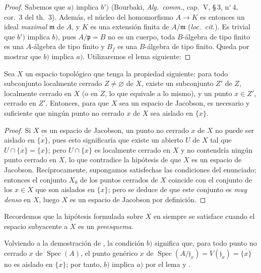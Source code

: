 \begin{proof}
Sabemos que $a)$ implica $b')$ (Bourbaki, \emph{Alg.\ comm.}, cap.~V, \S\,3, n$^\circ$\,4, cor.~3 del th.~3).
Además, el núcleo del homomorfismo $A\to K$ es entonces un ideal \emph{maximal} $\mathfrak{m}$ de $A$, y $K$ es una extensión finita de $A/\mathfrak{m}$ (\emph{loc.\ cit.}).
Es trivial que $b')$ implica $b)$, pues $A/\mathfrak{p}=B$ no es un cuerpo, toda $B$-álgebra de tipo finito es una $A$-álgebra de tipo finito y $B_f$ es una $B$-álgebra de tipo finito.
Queda por mostrar que $b)$ implica $a)$.
Utilizaremos el lema siguiente:
\end{proof}

\begin{lemma}[10.4.5.1]
\label{IV.10.4.5.1}
Sea $X$ un espacio topológico que tenga la propiedad siguiente: para todo subconjunto localmente cerrado $Z\neq\varnothing$ de $X$, existe un subconjunto $Z'$ de $Z$, localmente cerrado en $X$ (o en $Z$, lo que equivale a lo mismo), y un punto $x\in Z'$, cerrado en $Z'$.
Entonces, para que $X$ sea un espacio de Jacobson, es necesario y suficiente que ningún punto no cerrado $x$ de $X$ sea aislado en $\overline{\{x\}}$.
\end{lemma}

\begin{proof}
Si $X$ es un espacio de Jacobson, un punto no cerrado $x$ de $X$ no puede ser aislado en $\overline{\{x\}}$, pues esto significaría que existe un abierto $U$ de $X$ tal que $U\cap\overline{\{x\}}=\{x\}$; pero $U\cap\overline{\{x\}}$ es localmente cerrado en $X$ y no contendría ningún punto cerrado en $X$, lo que contradice la hipótesis de que $X$ es un espacio de Jacobson.
Recíprocamente, supongamos satisfechas las condiciones del enunciado; entonces el conjunto $X_0$ de los puntos cerrados de $X$ coincide con el conjunto de los $x\in X$ que son aislados en $\overline{\{x\}}$; pero se deduce de  que
este conjunto es \emph{muy denso} en $X$, luego $X$ es un espacio de Jacobson por definición.
\end{proof}

Recordemos  que la hipótesis formulada sobre $X$ en  siempre se satisface cuando el espacio subyacente a $X$ es un \emph{preesquema}.

Volviendo a la demostración de , la condición $b)$ significa que, para todo punto no cerrado $x$ de $\operatorname{Spec}(A)$, el punto genérico $x$ de $\operatorname{Spec}(A/\mathfrak{j}_x)=V(\mathfrak{j}_x)=\overline{\{x\}}$ no es aislado en $\overline{\{x\}}$; por tanto, $b)$ implica $a)$ por el lema  y .

